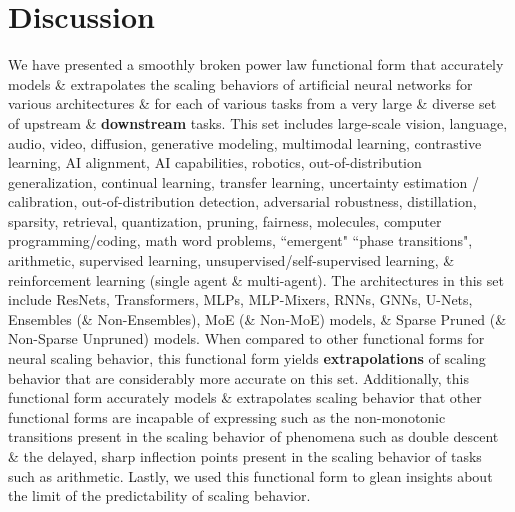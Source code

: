 \documentclass{article} %
\begin{document}
%
\vspace{-1.925mm}
\section{Discussion}
\vspace{-2.035mm}
We have presented a smoothly broken power law functional form that accurately models \& extrapolates the scaling behaviors of artificial neural networks for various architectures \& for each of various tasks from a very large \& diverse set of upstream \& \textbf{downstream} tasks. This set includes large-scale vision, language, audio, video, diffusion, generative modeling, multimodal learning, contrastive learning, AI alignment, AI capabilities, robotics, out-of-distribution generalization, continual learning, transfer learning, uncertainty estimation / calibration, out-of-distribution detection, adversarial robustness, distillation, sparsity, retrieval, quantization, pruning, fairness, molecules, computer programming/coding, math word problems, ``emergent" ``phase transitions", arithmetic, supervised learning, unsupervised/self-supervised learning, \& reinforcement learning (single agent \& multi-agent). 
The architectures in this set include ResNets, Transformers, MLPs, MLP-Mixers, RNNs, GNNs, U-Nets, Ensembles (\& Non-Ensembles), MoE (\& Non-MoE) models, \& Sparse Pruned (\& Non-Sparse Unpruned) models.
When compared to other functional forms for neural scaling behavior, this functional form yields \textbf{extrapolations} of scaling behavior that are considerably more accurate on this set. Additionally, this functional form accurately models \& extrapolates scaling behavior that other functional forms are incapable of expressing such as the non-monotonic transitions present in the scaling behavior of phenomena such as double descent \& the delayed, sharp inflection points present in the scaling behavior of tasks such as arithmetic. Lastly, we used this functional form to glean insights about the limit of the predictability of scaling behavior.

\end{document}
